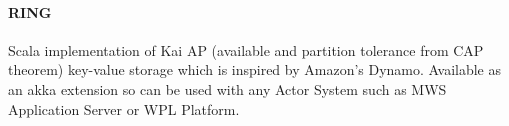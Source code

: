 \paragraph{RING}
Scala implementation of Kai AP (available and partition tolerance from CAP theorem) key-value storage which is inspired by Amazon's Dynamo.
Available as an akka extension so can be used with any Actor System such as MWS Application Server or WPL Platform.
